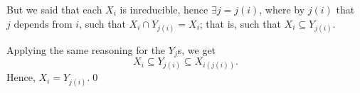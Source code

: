 \documentclass{subfiles}
\begin{document}
\begin{proof*}
\begin{enumerate}
                But we said that each \(X_{i}\) is inreducible, hence \(\exists j = j(i)\),
                where by \(j(i)\) that \(j \text{ depends from } i\), such that \(X_{i} \cap Y_{j(i)} = X_{i}\);
                that is, such that \(X_{i} \subseteq Y_{j(i)}\).

                Applying the same reasoning for the \(Y_{j}\)s, we get 
                \[
                    X_{i} \subseteq Y_{j(i)} \subseteq X_{i(j(i))}.
                \]
                Hence, \(X_{i} = Y_{j(i)}\).\qed
        \end{enumerate}
    \end{proof*}
\end{document}
